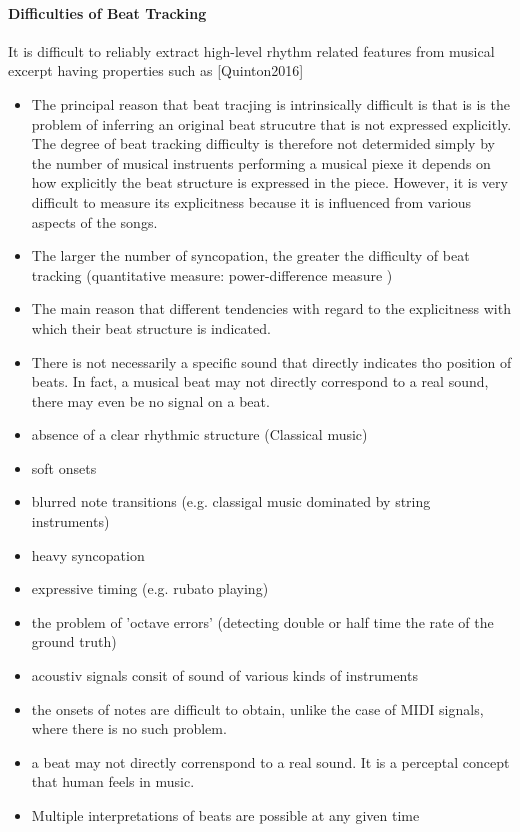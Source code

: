 \documentclass{scrartcl}
\begin{document}
\paragraph{Difficulties of Beat Tracking}
\label{sec:difficulties}
It is difficult to reliably extract high-level rhythm related features from musical excerpt having properties such as [Quinton2016]
\begin{itemize}
\item The principal reason that beat tracjing is intrinsically difficult is that is is the problem of inferring an original beat strucutre that is not expressed explicitly. The degree of beat tracking difficulty is therefore not determided simply by the number of musical instruents performing a musical piexe it depends on how explicitly the beat structure is expressed in the piece. However, it is very difficult to measure its explicitness because it is influenced from various aspects of the songs.
\item The larger the number of syncopation, the greater the difficulty of beat tracking (quantitative measure: power-difference measure \cite{Goto1999})
\item The main reason that different tendencies with regard to the explicitness with which their beat structure is indicated.
\item There is not necessarily a specific sound that directly indicates tho position of beats. In fact, a musical beat may not directly correspond to a real sound, there may even be no signal on a beat. 
\item absence of a clear rhythmic structure (Classical music)
\item soft onsets
\item blurred note transitions (e.g. classigal music dominated by string instruments)
\item heavy syncopation
\item expressive timing (e.g. rubato playing)
\item the problem of 'octave errors' (detecting double or half time the rate of the ground truth)
\item acoustiv signals consit of sound of various kinds of instruments
\item the onsets of notes are difficult to obtain, unlike the case of MIDI signals, where there is no such problem.
\item a beat may not directly correnspond to a real sound. It is a perceptal concept that human feels in music. 
\item Multiple interpretations of beats are possible at any given time

\end{itemize}
\end{document}
